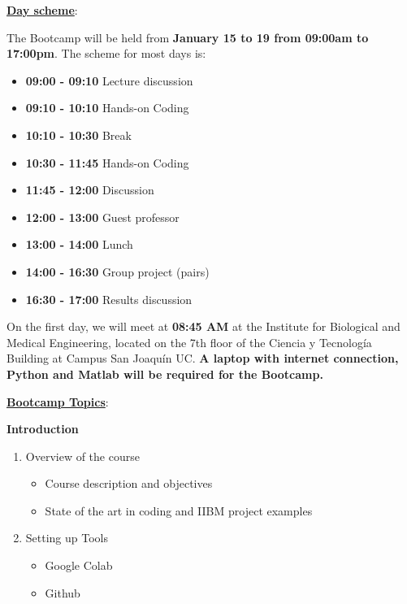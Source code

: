 \documentclass[letter,11pt]{article}
\begin{document}
\begin{flushleft}
{\begin{itemize}
\end{itemize}

\underline{\textbf{Day scheme}}:

The Bootcamp will be held from \textbf{January 15 to 19 from 09:00am to 17:00pm}. The scheme for most days is:

\begin{itemize}
    \itemsep-0.3em 
    \item \textbf{09:00 - 09:10} \Large Lecture discussion \large
    \item \textbf{09:10 - 10:10} \Large Hands-on Coding \large
    \item \textbf{10:10 - 10:30} \Large Break \large
    \item \textbf{10:30 - 11:45} \Large Hands-on Coding \large
    \item \textbf{11:45 - 12:00} \Large Discussion \large
    \item \textbf{12:00 - 13:00} \Large Guest professor\large
    \item \textbf{13:00 - 14:00} \Large Lunch \large
    \item \textbf{14:00 - 16:30} \Large Group project (pairs) \large
    \item \textbf{16:30 - 17:00} \Large Results discussion \large
    
\end{itemize}

On the first day, we will meet at \textbf{08:45 AM} at the Institute for Biological and Medical Engineering, located on the 7th floor of the Ciencia y Tecnología Building at Campus San Joaquín UC. \textbf{A laptop with internet connection, Python and Matlab will be required for the Bootcamp.} 



\newpage
\underline{\textbf{Bootcamp Topics}}:

\vspace{0.3cm}
\hspace{0.7cm}  \Large \textbf{Introduction} \large
\vspace{-0.5cm}
\begin{enumerate}
    \itemsep-0.4em 
    \item Overview of the course
    \begin{itemize}
        \vspace{-0.3cm}
        \item Course description and objectives
        \item State of the art in coding and IIBM project examples
    \end{itemize}
    \item Setting up Tools
        \begin{itemize}
            \vspace{-0.3cm}
            \item Google Colab
            \item Github
        \end{itemize}
        

\end{enumerate}}
\end{flushleft}
\end{document}
